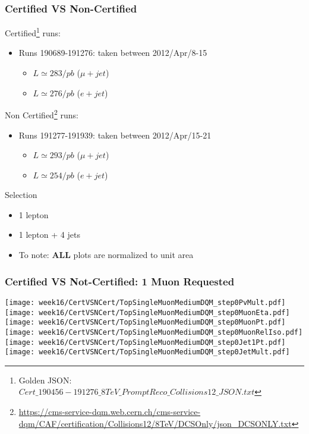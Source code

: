 \documentclass{beamer}
\begin{document}
\begin{frame}
\frametitle{Certified VS Non-Certified}
Certified\footnote{Golden JSON: \href{https://cms-service-dqm.web.cern.ch/cms-service-dqm/CAF/certification/Collisions12/8TeV/Prompt/Cert_190456-191276\_8TeV\_PromptReco\_Collisions12\_JSON.txt}{$Cert\_190456-191276\_8TeV\_PromptReco\_Collisions12\_JSON.txt$}} runs:
\begin{itemize}
\item Runs 190689-191276: taken between 2012/Apr/8-15
\begin{itemize}
\item $L\simeq 283/pb$ ($\mu+jet$)
\item $L\simeq 276/pb$ ($e+jet$)
\end{itemize}
\end{itemize}
Non Certified\footnote{\url{https://cms-service-dqm.web.cern.ch/cms-service-dqm/CAF/certification/Collisions12/8TeV/DCSOnly/json_DCSONLY.txt}} runs:
\begin{itemize}
\item Runs 191277-191939: taken between 2012/Apr/15-21
\begin{itemize}
\item $L\simeq 293/pb$ ($\mu+jet$)
\item $L\simeq 254/pb$ ($e+jet$)
\end{itemize}
\end{itemize}
Selection
\begin{itemize}
\item 1 lepton
\item 1 lepton + 4 jets
\end{itemize}
\begin{itemize}
\item To note: \textbf{ALL} plots are normalized to unit area
\end{itemize}
\end{frame}



\begin{frame}
\frametitle{Certified VS Not-Certified: 1 Muon Requested}
\hspace{-0.7cm}
\texttt{[image: week16/CertVSNCert/TopSingleMuonMediumDQM\_step0PvMult.pdf]}
\texttt{[image: week16/CertVSNCert/TopSingleMuonMediumDQM\_step0MuonEta.pdf]}
\texttt{[image: week16/CertVSNCert/TopSingleMuonMediumDQM\_step0MuonPt.pdf]}\\
\hspace{-0.7cm}
\texttt{[image: week16/CertVSNCert/TopSingleMuonMediumDQM\_step0MuonRelIso.pdf]}
\texttt{[image: week16/CertVSNCert/TopSingleMuonMediumDQM\_step0Jet1Pt.pdf]}
\texttt{[image: week16/CertVSNCert/TopSingleMuonMediumDQM\_step0JetMult.pdf]}
\end{frame}
\end{document}
